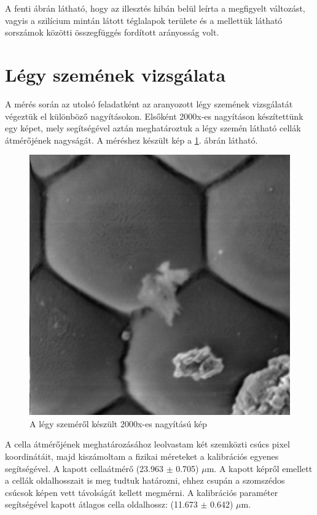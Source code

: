 \documentclass[12pt,a4paper]{article}
\begin{document}
A fenti ábrán látható, hogy az illesztés hibán belül leírta a megfigyelt változást, vagyis a szilícium mintán látott téglalapok területe és a mellettük látható sorszámok közötti összegfüggés fordított arányosság volt.

\newpage
\section{Légy szemének vizsgálata}
\hspace*{10pt} A mérés során az utolsó feladatként az aranyozott légy szemének vizsgálatát végeztük el különböző nagyításokon. Elsőként 2000x-es nagyításon készítettünk egy képet, mely segítségével aztán meghatároztuk a légy szemén látható cellák átmérőjének nagyságát. A méréshez készült kép a \ref{fig:legy_nagy}. ábrán látható.\\
\begin{figure}[!h]
\centering
\includegraphics[width=0.8\linewidth]{E/E/014_s}
\caption{A légy szeméről készült 2000x-es nagyítású kép}
\label{fig:legy_nagy}
\end{figure}
\newline
A cella átmérőjének meghatározásához leolvastam két szemközti csúcs pixel koordinátáit, majd kiszámoltam a fizikai méreteket a kalibrációs egyenes segítségével. A kapott cellaátmérő (23.963 $\pm$ 0.705) $\mu$m. A kapott képről emellett a cellák oldalhosszait is meg tudtuk határozni, ehhez csupán a szomszédos csúcsok képen vett távolságát kellett megmérni. A kalibrációs paraméter segítségével kapott átlagos cella oldalhossz: (11.673 $\pm$ 0.642) $\mu$m.\\
\end{document}
